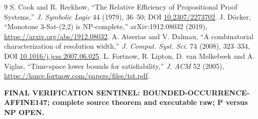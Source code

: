 \documentclass[11pt]{article}
\begin{document}
\begin{thebibliography}{9}
 S. Cook and R. Reckhow, ``The Relative Efficiency of Propositional Proof Systems,'' \emph{J. Symbolic Logic} 44 (1979), 36--50; DOI \href{https://doi.org/10.2307/2273702}{10.2307/2273702}.
 J. D\"ocker, ``Monotone 3-Sat-(2,2) is NP-complete,'' arXiv:1912.08032 (2019), \url{https://arxiv.org/abs/1912.08032}.
 A. Atserias and V. Dalmau, ``A combinatorial characterization of resolution width,'' \emph{J. Comput. Syst. Sci.} 74 (2008), 323--334, DOI \href{https://doi.org/10.1016/j.jcss.2007.06.025}{10.1016/j.jcss.2007.06.025}.
 L. Fortnow, R. Lipton, D. van Melkebeek and A. Viglas, ``Time-space lower bounds for satisfiability,'' \emph{J. ACM} 52 (2005), \url{https://lance.fortnow.com/papers/files/tst.pdf}.
\end{thebibliography}

\noindent\textbf{FINAL VERIFICATION SENTINEL: BOUNDED-OCCURRENCE-AFFINE147; complete source theorem and executable raw; P versus NP OPEN.}
\end{document}
